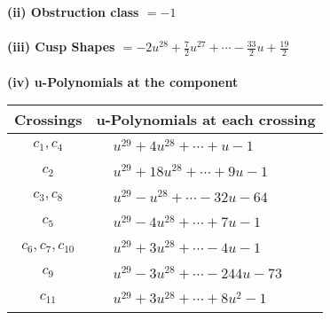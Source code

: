 \documentclass[1p]{elsarticle_modified}
\theoremstyle{definition}
\begin{document}
\flushleft \textbf{(ii) Obstruction class $= -1$}\\~\\
\flushleft \textbf{(iii) Cusp Shapes $= -2 u^{28}+\frac{7}{2} u^{27}+\cdots-\frac{33}{2} u+\frac{19}{2}$}\\~\\
\newpage\renewcommand{\arraystretch}{1}
\flushleft \textbf{(iv) u-Polynomials at the component}\newline \\
\begin{tabular}{m{50pt}|m{274pt}}
Crossings & \hspace{64pt}u-Polynomials at each crossing \\
\hline $$\begin{aligned}c_{1},c_{4}\end{aligned}$$&$\begin{aligned}
&u^{29}+4 u^{28}+\cdots+u-1
\end{aligned}$\\
\hline $$\begin{aligned}c_{2}\end{aligned}$$&$\begin{aligned}
&u^{29}+18 u^{28}+\cdots+9 u-1
\end{aligned}$\\
\hline $$\begin{aligned}c_{3},c_{8}\end{aligned}$$&$\begin{aligned}
&u^{29}- u^{28}+\cdots-32 u-64
\end{aligned}$\\
\hline $$\begin{aligned}c_{5}\end{aligned}$$&$\begin{aligned}
&u^{29}-4 u^{28}+\cdots+7 u-1
\end{aligned}$\\
\hline $$\begin{aligned}c_{6},c_{7},c_{10}\end{aligned}$$&$\begin{aligned}
&u^{29}+3 u^{28}+\cdots-4 u-1
\end{aligned}$\\
\hline $$\begin{aligned}c_{9}\end{aligned}$$&$\begin{aligned}
&u^{29}-3 u^{28}+\cdots-244 u-73
\end{aligned}$\\
\hline $$\begin{aligned}c_{11}\end{aligned}$$&$\begin{aligned}
&u^{29}+3 u^{28}+\cdots+8 u^2-1
\end{aligned}$\\
\hline
\end{tabular}\\~\\
\end{document}
